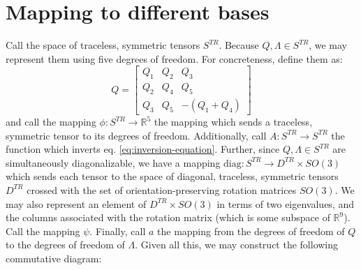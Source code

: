 \documentclass[reqno]{article}
\begin{document}
\section{Mapping to different bases}
Call the space of traceless, symmetric tensors $S^{TR}$.
Because $Q, \Lambda \in S^{TR}$, we may represent them using five degrees of freedom.
For concreteness, define them as:
\begin{equation} \label{eq:degrees-of-freedom}
    Q
    =
    \begin{bmatrix}
        Q_1 &Q_2 &Q_3 \\
        Q_2 &Q_4 &Q_5 \\
        Q_3 &Q_5 &-(Q_1 + Q_4)
    \end{bmatrix}
\end{equation}
and call the mapping $\phi: S^{TR} \to \mathbb{R}^5$ the mapping which sends a traceless, symmetric tensor to its degrees of freedom.
Additionally, call $A: S^{TR} \to S^{TR}$ the function which inverts eq. \eqref{eq:inversion-equation}.
Further, since $Q, \Lambda \in S^{TR}$ are simultaneously diagonalizable, we have a mapping $\text{diag}: S^{TR} \to D^{TR} \times SO(3)$ which sends each tensor to the space of diagonal, traceless, symmetric tensors $D^{TR}$ crossed with the set of orientation-preserving rotation matrices $SO(3)$.
We may also represent an element of $D^{TR} \times SO(3)$ in terms of two eigenvalues, and the columns associated with the rotation matrix (which is some subspace of $\mathbb{R}^9$). 
Call the mapping $\psi$.
Finally, call $a$ the mapping from the degrees of freedom of $Q$ to the degrees of freedom of $\Lambda$.
Given all this, we may construct the following commutative diagram:
\begin{figure}[H]
  \centering
  \label{fig:commutative-diagram}
\end{figure}
\end{document}
